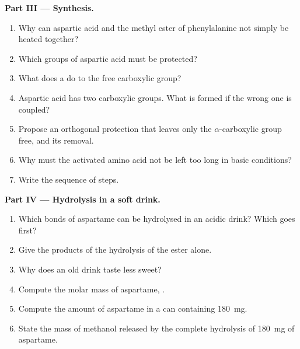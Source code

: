 \begin{problem}
\medskip
\noindent\textbf{Part III --- Synthesis.}
\begin{enumerate}[resume]
  \item Why can aspartic acid and the methyl ester of phenylalanine not simply be heated together?
  \item Which groups of aspartic acid must be protected?
  \item What does a  do to the free carboxylic group?
  \item Aspartic acid has two carboxylic groups. What is formed if the wrong one is coupled?
  \item Propose an orthogonal protection that leaves only the $\alpha$-carboxylic group free, and its
        removal.
  \item Why must the activated amino acid not be left too long in basic conditions?
  \item Write the sequence of steps.
\end{enumerate}

\medskip
\noindent\textbf{Part IV --- Hydrolysis in a soft drink.}
\begin{enumerate}[resume]
  \item Which bonds of aspartame can be hydrolysed in an acidic drink? Which goes first?
  \item Give the products of the hydrolysis of the ester alone.
  \item Why does an old drink taste less sweet?
  \item Compute the molar mass of aspartame, .
  \item Compute the amount of aspartame in a can containing \qty{180}{mg}.
  \item State the mass of methanol released by the complete hydrolysis of \qty{180}{mg} of
        aspartame.
\end{enumerate}
\end{problem}
